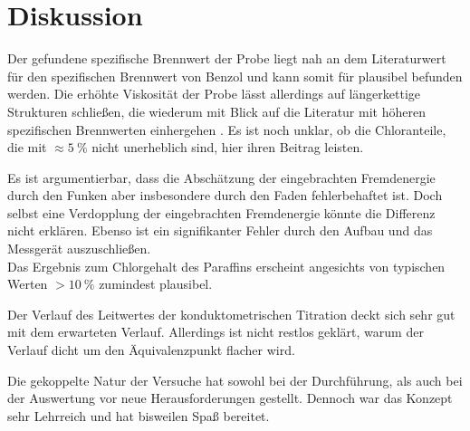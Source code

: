 \chapter{Diskussion}
	Der gefundene spezifische Brennwert der Probe liegt nah an dem Literaturwert für den spezifischen Brennwert von Benzol und kann
	somit für plausibel befunden werden. Die erhöhte Viskosität der Probe lässt allerdings auf längerkettige Strukturen schließen, die
	wiederum mit Blick auf die Literatur mit höheren spezifischen Brennwerten einhergehen \cite{Tabellenbuch.chemie.Wachter.2012}. Es ist noch unklar, ob die Chloranteile,
	die mit \(\approx \SI{5}{\percent}\) nicht unerheblich sind, hier ihren Beitrag leisten.\par
	Es ist argumentierbar, dass die Abschätzung der eingebrachten Fremdenergie durch den Funken aber insbesondere durch den Faden
	fehlerbehaftet ist. Doch selbst eine Verdopplung der eingebrachten Fremdenergie könnte die Differenz nicht erklären. Ebenso ist
	ein signifikanter Fehler durch den Aufbau und das Messgerät auszuschließen.\\
	Das Ergebnis zum Chlorgehalt des Paraffins erscheint angesichts von typischen Werten \(> \SI{10}{\percent}\) zumindest plausibel.

	Der Verlauf des Leitwertes der konduktometrischen Titration deckt sich sehr gut mit dem erwarteten Verlauf. Allerdings ist nicht restlos geklärt,
	warum der Verlauf dicht um den Äquivalenzpunkt flacher wird.

	Die gekoppelte Natur der Versuche hat sowohl bei der Durchführung, als auch bei der Auswertung vor neue Herausforderungen gestellt.
	Dennoch war das Konzept sehr Lehrreich und hat bisweilen Spaß bereitet.